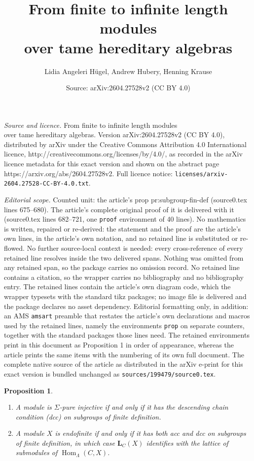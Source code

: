 \documentclass[10pt,a4paper]{amsart}
\title{From finite to infinite length modules\\ over tame hereditary algebras}
\author{Lidia Angeleri H\"ugel, Andrew Hubery, Henning Krause}
\date{Source: arXiv:2604.27528v2 (CC BY 4.0)}
\newtheorem{prop}{Proposition}
\newcommand{\Hom}{\operatorname{Hom}}
\def\bfL{\mathbf L}
\begin{document}
\maketitle

\noindent\emph{Source and licence.} From finite to infinite length modules\\ over tame hereditary algebras. Version arXiv:2604.27528v2 (CC BY 4.0), distributed by arXiv under the Creative Commons Attribution 4.0 International licence, http://creativecommons.org/licenses/by/4.0/, as recorded in the arXiv licence metadata for this exact version and shown on the abstract page https://arxiv.org/abs/2604.27528v2. Full licence notice: \texttt{licenses/arxiv-2604.27528-CC-BY-4.0.txt}.\par\smallskip

\noindent\textit{Editorial scope.} Counted unit: the article's prop pr:subgroup-fin-def (source0.tex lines 675--680). The article's complete original proof of it is delivered with it (source0.tex lines 682--721, one \texttt{proof} environment of 40 lines). No mathematics is written, repaired or re-derived: the statement and the proof are the article's own lines, in the article's own notation, and no retained line is substituted or re-flowed.  No further source-local context is needed: every cross-reference of every retained line resolves inside the two delivered spans.  Nothing was omitted from any retained span, so the package carries no omission record.  No retained line contains a citation, so the wrapper carries no bibliography and no bibliography entry.  The retained lines contain the article's own diagram code, which the wrapper typesets with the standard tikz packages; no image file is delivered and the package declares no asset dependency.  Editorial formatting only, in addition: an AMS \texttt{amsart} preamble that restates the article's own declarations and macros used by the retained lines, namely the environments \texttt{prop} on separate counters, together with the standard packages those lines need.  The retained environments print in this document as Proposition 1 in order of appearance, whereas the article prints the same items with the numbering of its own full document.  The complete native source of the article as distributed in the arXiv e-print for this exact version is bundled unchanged as \texttt{sources/199479/source0.tex}.
\begin{prop}\label{pr:subgroup-fin-def}
\begin{enumerate}
\item A module is $\Sigma$-pure injective if and only if it has the descending chain condition (dcc) on subgroups of finite definition.
\item A module $X$ is endofinite if and only if it has both acc and dcc on subgroups of finite definition, in which case $\bfL_C(X)$ identifies with the lattice of submodules of $\Hom_\Lambda(C,X)$.
\end{enumerate}
\end{prop}
\end{document}
